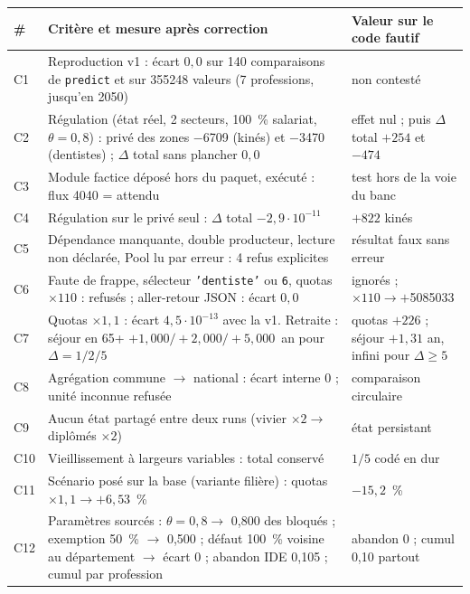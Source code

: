 \begin{table}[h]
\centering\small
\begin{tabular}{lp{6.3cm}p{5.0cm}}
\toprule
\# & Critère et mesure après correction & Valeur sur le code fautif \\
\midrule
C1 & Reproduction v1 : écart $0{,}0$\mesure{} sur 140 comparaisons de \texttt{predict} et sur
\num{355248} valeurs (7 professions, jusqu'en 2050) & non contesté \\
C2 & Régulation (état réel, 2 secteurs, 100~\% salariat, $\theta = 0{,}8$) : privé des zones
$-$\num{6709}\mesure{} (kinés) et $-$\num{3470}\mesure{} (dentistes) ; $\Delta$ total sans plancher
$0{,}0$\mesure{} & effet nul ; puis $\Delta$ total $+254$ et $-474$ \\
C3 & Module factice déposé hors du paquet, exécuté : flux \num{4040} = attendu & test hors de la
voie du banc \\
C4 & Régulation sur le privé seul : $\Delta$ total $-2{,}9\cdot10^{-11}$\mesure{} & $+822$ kinés \\
C5 & Dépendance manquante, double producteur, lecture non déclarée, Pool lu par erreur : 4 refus
explicites & résultat faux sans erreur \\
C6 & Faute de frappe, sélecteur \texttt{'dentiste'} ou \texttt{6}, quotas $\times110$ : refusés ;
aller-retour JSON : écart $0{,}0$ & ignorés ; $\times110 \to +$\num{5085033} \\
C7 & Quotas $\times1{,}1$ : écart $4{,}5\cdot10^{-13}$\mesure{} avec la v1. Retraite : séjour en
65+ $+1{,}000 / +2{,}000 / +5{,}000$\mesure{}~an pour $\Delta = 1/2/5$ & quotas $+226$ ; séjour
$+1{,}31$ an, infini pour $\Delta \ge 5$ \\
C8 & Agrégation commune $\to$ national : écart interne 0\mesure{} ; unité inconnue refusée &
comparaison circulaire \\
C9 & Aucun état partagé entre deux runs (vivier $\times2 \to$ diplômés $\times2$) & état
persistant \\
C10 & Vieillissement à largeurs variables : total conservé & $1/5$ codé en dur \\
C11 & Scénario posé sur la base (variante filière) : quotas $\times1{,}1 \to +6{,}53$\mesure{}~\% &
$-15{,}2$~\% \\
C12 & Paramètres sourcés : $\theta = 0{,}8 \to$ 0,800\mesure{} des bloqués ; exemption 50~\%
$\to$ 0,500\mesure{} ; défaut 100~\% voisine au département $\to$ écart 0 ; abandon IDE
0,105\derive{} ; cumul par profession & abandon 0 ; cumul 0,10 partout \\

\end{tabular}
\end{table}
